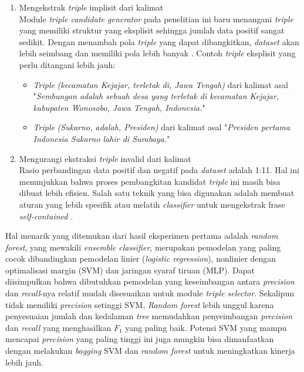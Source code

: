 \begin{enumerate}
	\item Mengekstrak \textit{triple} implisit dari kalimat \\
	Module \textit{triple candidate generator} pada penelitian ini baru menangani \textit{triple} yang memiliki struktur yang eksplisit sehingga jumlah data positif sangat sedikit. Dengan menambah pola \textit{triple} yang dapat dibangkitkan, \textit{dataset} akan lebih seimbang dan memiliki pola lebih banyak \citep{schmitz2012open}. Contoh \textit{triple} eksplisit yang perlu ditangani lebih jauh:
	\begin{itemize}
		\item \textit{Triple} \textit{(kecamatan Kejajar, terletak di, Jawa Tengah)} dari kalimat asal "\textit{Sembungan adalah sebuah desa yang terletak di kecamatan Kejajar, kabupaten Wonosobo, Jawa Tengah, Indonesia.}"		
		\item \textit{Triple} \textit{(Sukarno, adalah, Presiden)} dari kalimat asal "\textit{Presiden pertama Indonesia Sukarno lahir di Surabaya.}"
	\end{itemize} 
	
	\item Mengurangi ekstraksi \textit{triple} invalid dari kalimat \\
	Rasio perbandingan data positif dan negatif pada \textit{dataset} adalah 1:11. Hal ini menunjukkan bahwa proses pembangkitan kandidat \textit{triple} ini masih bisa dibuat lebih efisien. Salah satu teknik yang bisa digunakan adalah membuat aturan yang lebih spesifik atau melatih \textit{classifier} untuk mengekstrak frase \textit{self-contained} \citep{angeli2015leveraging}.
	
\end{enumerate}

Hal menarik yang ditemukan dari hasil eksperimen pertama adalah \textit{random forest}, yang mewakili \textit{ensemble classifier}, merupakan pemodelan yang paling cocok dibandingkan pemodelan linier (\textit{logistic regression}), nonlinier dengan optimalisasi margin (SVM) dan jaringan syaraf tiruan (MLP). Dapat diisimpulkan bahwa dibutuhkan pemodelan yang keseimbangan antara \textit{precision} dan \textit{recall}-nya relatif mudah disesuaikan untuk module \textit{triple selector}. Sekalipun tidak memiliki \textit{precision} setinggi SVM, \textit{Random forest} lebih unggul karena penyesuaian jumlah dan kedalaman \textit{tree} memudahkan penyeimbangan \textit{precision} dan \textit{recall} yang menghasilkan $F_1$ yang paling baik. Potensi SVM yang mampu mencapai \textit{precision} yang paling tinggi ini juga mungkin bisa dimanfaatkan dengan melakukan \textit{bagging} \citep{breiman1996bagging} SVM dan \textit{random forest} untuk meningkatkan kinerja lebih jauh.

